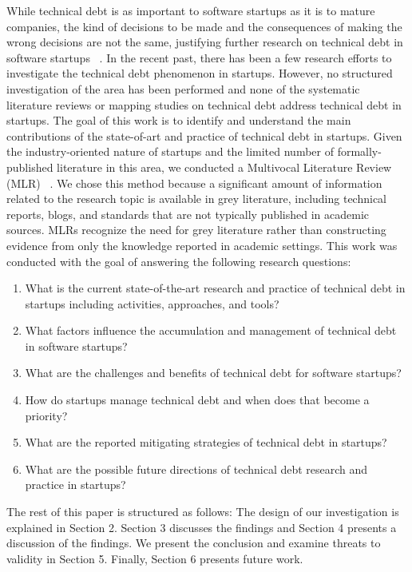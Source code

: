 \documentclass[manuscript]{acmart}
\begin{document}
While technical debt is as important to software startups as it is to mature companies, the kind of decisions to be made and the consequences of making the wrong decisions are not the same, justifying further research on technical debt in software startups ~\cite{Unterkalmsteiner16}. In the recent past, there has been a few research efforts to investigate the technical debt phenomenon in startups. However, no structured investigation of the area has been performed and none of the systematic literature reviews or mapping studies on technical debt address technical debt in startups. The goal of this work is to identify and understand the main contributions of the state-of-art and practice of technical debt in startups. Given the industry-oriented nature of startups and the limited number of formally-published literature in this area, we conducted a Multivocal Literature Review (MLR) ~\cite{GAROUSI2019101}. We chose this method because a significant amount of information related to the research topic is available in grey literature, including technical reports, blogs, and standards that are not typically published in academic sources. MLRs recognize the need for grey literature rather than constructing evidence from only the knowledge reported in academic settings.
This work was conducted with the goal of answering the following research questions:
\begin{enumerate}
\item What is the current state-of-the-art research and practice of technical debt in startups including activities, approaches, and tools?
\item {What factors influence the accumulation and management of technical debt in software startups?}
\item {What are the challenges and benefits of technical debt for software startups?}
\item {How do startups manage technical debt and when does that become a priority?}
\item What are the reported mitigating strategies of technical debt in startups?
\item What are the possible future directions of technical debt research and practice in startups?
\end{enumerate}

The rest of this paper is structured as follows: The design of our investigation is explained in Section 2. Section 3 discusses the findings and Section 4 presents a discussion of the findings. We present the conclusion and examine threats to validity in Section 5. Finally, Section 6 presents future work.
\end{document}
